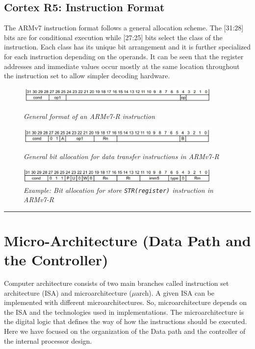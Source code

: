 \documentclass[a4paper,11pt]{article}
\begin{document}
\subsection{Cortex R5: Instruction Format}
The ARMv7 instruction format follows a general allocation scheme. The [31:28] bits are for conditional execution while [27:25] bits select the class of the instruction. Each class has its unique bit arrangement and it is further specialized for each instruction depending on the operands. It can be seen that the register addresses and immediate values occur mostly at the same location throughout the instruction set to allow simpler decoding hardware.
\begin{figure}[H]
\centering
\includegraphics[width=0.90\textwidth]{figures/CortexFormatGen.jpg}
\caption{{\small \textit{General format of an ARMv7-R instruction}}\cite{ARMref}}
\includegraphics[width=0.90\textwidth]{figures/CortexLDR.jpg}
\caption{{\small \textit{General bit allocation for data transfer instructions in ARMv7-R}}\cite{ARMref}}
\includegraphics[width=0.90\textwidth]{figures/CortexSTR.jpg}
\caption{{\small \textit{Example: Bit allocation for store {\tt STR(register)} instruction in ARMv7-R}}\cite{ARMref}}
\end{figure}
\vspace{1cm}\hrule

\section{Micro-Architecture (Data Path and the Controller)}
Computer architecture consists of two main branches called instruction set architecture (ISA) and microarchitecture ($\mu$arch). A given ISA can be implemented with different microarchitectures. So, microarchitecture depends on the ISA and the technologies used in implementations. The microarchitecture is the digital logic that defines the way of how the instructions should be executed. Here we have focused on the organization of the Data path and the controller of the internal processor design\cite{pcmag}.
\end{document}
